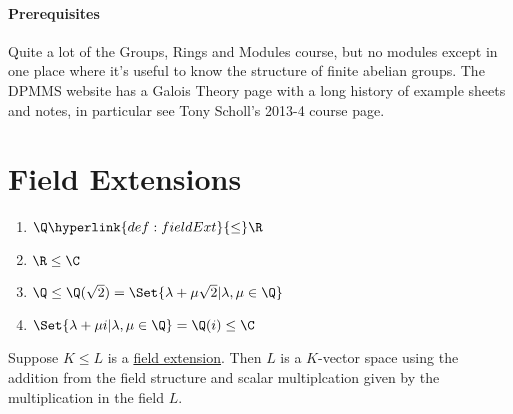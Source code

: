 \documentclass{article}
\begin{document}

\paragraph{Prerequisites} Quite a lot of the Groups, Rings and Modules course, but no modules except in one place where it's useful to know the structure of finite abelian groups.
The DPMMS website has a Galois Theory page with a long history of example sheets and notes, in particular see Tony Scholl's 2013-4 course page.
\clearpage

\section{Field Extensions}\label{sec:1}

\begin{eg}
    \leavevmode
    \begin{enumerate}[label=(\roman*)]
        \item $\Q \hyperlink{def:fieldExt}{\leq} \R$
        \item $\R \leq \C$
        \item $\Q \leq \Q(\sqrt{2}) = \Set{\lambda + \mu \sqrt{2} | \lambda, \mu \in \Q}$
        \item $\Set{\lambda + \mu i | \lambda, \mu \in \Q} = \Q(i) \leq \C$
    \end{enumerate}
\end{eg}

Suppose $K \leq L$ is a \hyperlink{def:fieldExt}{field extension}. Then $L$ is a $K$-vector space using the addition from the field structure and scalar multiplcation given by the multiplication in the field $L$.
\end{document}
